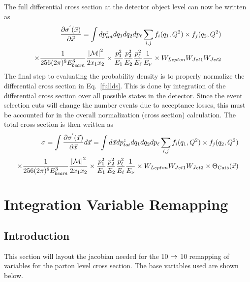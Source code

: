 The full differential cross section at the detector object level can
now be written as
\begin{eqnarray}
\label{fullds}
\nonumber
\frac{\partial \sigma^{'}(\vec{x})}{\partial \vec{x}} =
\int dp^{z}_{tot}dq_{1}dq_{2}dp_{\ell} \sum_{i,j}
f_{i}(q_{1}, Q^{2}) \times f_{j}(q_{2}, Q^{2}) \\
\times \frac{1}{256(2\pi)^{8}E^{3}_{beam}}
\frac{{|\cal M|}^{2}}{2x_{1}x_{2}} \times
\frac{p_{1}^{2}}{E_{1}} \frac{p_{2}^{2}}{E_{2}} 
\frac{p_{\ell}^{2}}{E_{\ell}} \frac{1}{E_{\nu}}
\times W_{Lepton}W_{Jet1}W_{Jet2}
\end{eqnarray}
\noindent The final step to evaluating the probability density is to
properly normalize the differential cross section in
Eq.~\ref{fullds}. This is done by integration of the differential
cross section over all possible states in the detector. Since the
event selection cuts will change the number events due to acceptance
losses, this must be accounted for in the overall normalization (cross
section) calculation. The total cross section is then written as
\begin{eqnarray}
\label{norm}
\nonumber
\sigma = \int \frac{\partial \sigma^{'}(\vec{x})}{\partial \vec{x}} d\vec{x} =
\int d\vec{x}dp^{z}_{tot}dq_{1}dq_{2}dp_{\ell} \sum_{i,j}
f_{i}(q_{1}, Q^{2}) \times f_{j}(q_{2}, Q^{2}) \\
\times \frac{1}{256(2\pi)^{8}E^{3}_{beam}}
\frac{{|\cal M|}^{2}}{2x_{1}x_{2}} \times
\frac{p_{1}^{2}}{E_{1}} \frac{p_{2}^{2}}{E_{2}} 
\frac{p_{\ell}^{2}}{E_{\ell}} \frac{1}{E_{\nu}}
\times W_{Lepton}W_{Jet1}W_{Jet2} \times \Theta_{\rm{Cuts}}(\vec{x})
\end{eqnarray}

 \section{Integration Variable Remapping}

\subsection{Introduction}
This section will layout the jacobian needed for the 10 $\rightarrow$ 10 remapping of
variables for the parton level cross section. The base variables used are shown below.

